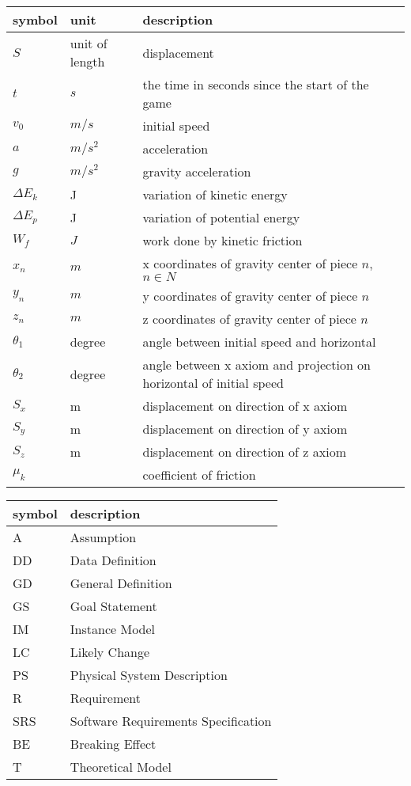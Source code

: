 \documentclass[12pt, titlepage]{article}
\begin{document}
	\renewcommand{\arraystretch}{1.2}
	\noindent \begin{tabular}{l l l} 
		\toprule		
		\textbf{symbol} & \textbf{unit} & \textbf{description}\\
		\midrule 
		$S$ & unit of length & displacement
		\\
		$t$ & $s$ & the time in seconds since the start of the game
		\\  
		$v_{0}$ & $m/s$ & initial speed
		\\ 
		$a$ & $m/s^2$ & acceleration
		\\
		$g$ & $m/s^2$ & gravity acceleration
		\\
		$\Delta E_{k}$ & J & variation of kinetic energy
		\\
		$\Delta E_{p}$ & J & variation of potential energy
		\\
		$W_{f}$ & $J$ & work done by kinetic friction
		\\
		$x_{n}$ & $m$ & x coordinates of gravity center of piece $n$, $n \in N$
		\\
		$y_{n}$ & $m$ & y coordinates of gravity center of piece $n$
		\\
		$z_{n}$ & $m$ & z coordinates of gravity center of piece $n$
		\\
		$\theta_{1}$ & degree & angle between initial speed and horizontal
		\\
		$\theta_{2}$ & degree & angle between
		x axiom and projection on horizontal of initial speed
		\\
		$S_{x}$ & m & displacement on direction of x axiom
		\\
		$S_{y}$ & m & displacement on direction of y axiom
		\\
		$S_{z}$ & m & displacement on direction of z axiom
		\\
		$\mu_k$ &  & coefficient of friction
		\\
		\bottomrule
	\end{tabular}
	
	\renewcommand{\arraystretch}{1.2}
	\begin{tabular}{l l} 
		\toprule		
		\textbf{symbol} & \textbf{description}\\
		\midrule 
		A & Assumption\\
		DD & Data Definition\\
		GD & General Definition\\
		GS & Goal Statement\\
		IM & Instance Model\\
		LC & Likely Change\\
		PS & Physical System Description\\
		R & Requirement\\
		SRS & Software Requirements Specification\\
		BE & Breaking Effect\\
		T & Theoretical Model\\
		\bottomrule
	\end{tabular}\\
	
\end{document}
